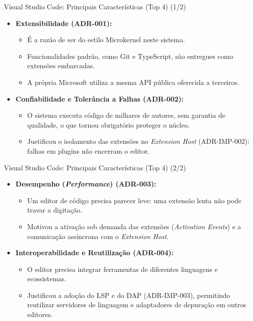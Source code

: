 \documentclass[aspectratio=169]{beamer}
\begin{document}
\begin{frame}{Visual Studio Code: Principais Características (Top 4) (1/2)}
\begin{itemize}\setlength{\itemsep}{0.8em}
\item \textbf{Extensibilidade (ADR-001):}
  \begin{itemize}
  \item É a razão de ser do estilo Microkernel neste sistema.
  \item Funcionalidades padrão, como Git e TypeScript, são entregues como extensões embarcadas.
  \item A própria Microsoft utiliza a mesma API pública oferecida a terceiros.
  \end{itemize}
\item \textbf{Confiabilidade e Tolerância a Falhas (ADR-002):}
  \begin{itemize}
  \item O sistema executa código de milhares de autores, sem garantia de qualidade, o que tornou obrigatório proteger o núcleo.
  \item Justificou o isolamento das extensões no \textit{Extension Host} (ADR-IMP-002): falhas em plugins não encerram o editor.
  \end{itemize}
\end{itemize}
\end{frame}

\begin{frame}{Visual Studio Code: Principais Características (Top 4) (2/2)}
\begin{itemize}\setlength{\itemsep}{0.8em}
\item \textbf{Desempenho (\textit{Performance}) (ADR-003):}
  \begin{itemize}
  \item Um editor de código precisa parecer leve: uma extensão lenta não pode travar a digitação.
  \item Motivou a ativação sob demanda das extensões (\textit{Activation Events}) e a comunicação assíncrona com o \textit{Extension Host}.
  \end{itemize}
\item \textbf{Interoperabilidade e Reutilização (ADR-004):}
  \begin{itemize}
  \item O editor precisa integrar ferramentas de diferentes linguagens e ecossistemas.
  \item Justificou a adoção do LSP e do DAP (ADR-IMP-003), permitindo reutilizar servidores de linguagem e adaptadores de depuração em outros editores.
  \end{itemize}
\end{itemize}
\end{frame}
\end{document}
